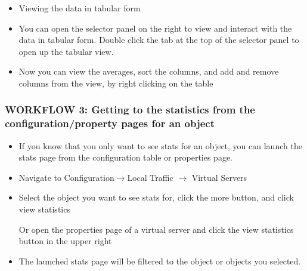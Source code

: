 \documentclass[letterpaper,10pt,english]{sphinxmanual}
\begin{document}
\begin{itemize}
\item {} 
Viewing the data in tabular form

\item {} 
You can open the selector panel on the right to view and interact
with the data in tabular form. Double click the tab at the top of
the selector panel to open up the tabular view.



\item {} 
Now you can view the averages, sort the columns, and add and remove
columns from the view, by right clicking on the table


\end{itemize}


\subsubsection{WORKFLOW 3: Getting to the statistics from the configuration/property pages for an object}
\label{\detokenize{class1/module4/lab6:workflow-3-getting-to-the-statistics-from-the-configuration-property-pages-for-an-object}}\begin{itemize}
\item {} 
If you know that you only want to see stats for an object, you can
launch the stats page from the configuration table or properties
page.

\item {} 
Navigate to Configuration\(\rightarrow\)Local Traffic \(\rightarrow\) Virtual Servers

\item {} 
Select the object you want to see stats for, click the more button,
and click view statistics


Or open the properties page of a virtual server and click the view
statistics button in the upper right


\item {} 
The launched stats page will be filtered to the object or objects
you selected.


\end{itemize}
\end{document}
